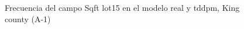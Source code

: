 \begin{figure}[H]
    \centering
    
    \caption{Frecuencia del campo Sqft lot15 en el modelo real y tddpm, King county (A-1)}
    \label{frecuency-tddpm-sqft lot15}
\end{figure}